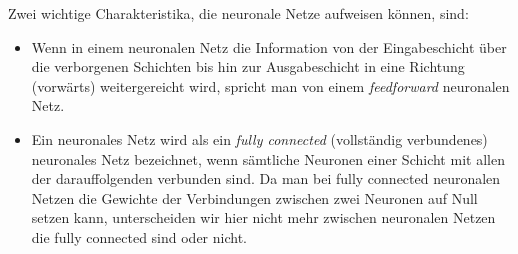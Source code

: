 %        
%        
%        
%        
%        
%    
%    
Zwei wichtige Charakteristika, die neuronale Netze aufweisen können, sind:
\begin{itemize}
\item Wenn in einem neuronalen Netz die Information von der Eingabeschicht über die verborgenen Schichten bis hin zur Ausgabeschicht in eine Richtung (\glqq vorwärts\grqq) weitergereicht wird, spricht man von einem \textit{feedforward} neuronalen Netz.
\item Ein neuronales Netz wird als ein \textit{fully connected} (\glqq vollständig verbundenes\grqq\@) neuronales Netz bezeichnet, wenn sämtliche Neuronen einer Schicht mit allen der darauffolgenden verbunden sind. Da man bei fully connected neuronalen Netzen die Gewichte der Verbindungen zwischen zwei Neuronen auf Null setzen kann, unterscheiden wir hier nicht mehr zwischen neuronalen Netzen die fully connected sind oder nicht.
\end{itemize}

